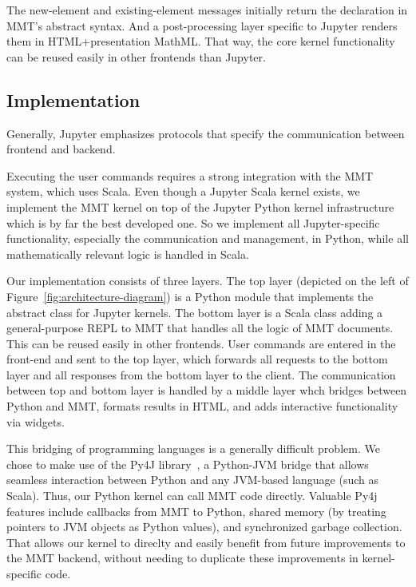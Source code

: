 The new-element and existing-element messages initially return the declaration in MMT's abstract syntax.
And a post-processing layer specific to Jupyter renders them in HTML+presentation MathML.
That way, the core kernel functionality can be reused easily in other frontends than Jupyter.

\subsection{Implementation}\label{sec:kernel:impl}

Generally, Jupyter emphasizes protocols that specify the communication between frontend and backend. 

Executing the user commands requires a strong integration with the MMT system, which uses Scala.
Even though a Jupyter Scala kernel exists, we implement the MMT kernel on top of the Jupyter Python kernel infrastructure which is by far the best developed one. 
So we implement all Jupyter-specific functionality, especially the communication and management, in Python, while all mathematically relevant logic is handled in Scala.

Our implementation consists of three layers.
The top layer (depicted on the left of Figure~\ref{fig:architecture-diagram}) is a Python module that implements the abstract class for Jupyter kernels.
The bottom layer is a Scala class adding a general-purpose REPL to MMT that handles all the logic of MMT documents.
This can be reused easily in other frontends.
User commands are entered in the front-end and sent to the top layer, which forwards all requests to the bottom layer and all responses from the bottom layer to the client.
The communication between top and bottom layer is handled by a middle layer whch bridges between Python and MMT, formats results in HTML, and adds interactive functionality via widgets.


This bridging of programming languages is a generally difficult problem. 
We chose to make use of the Py4J library~\cite{Py4J:on}, a Python-JVM bridge that allows seamless interaction between Python and any JVM-based language (such as Scala).
Thus, our Python kernel can call MMT code directly.
Valuable Py4j features include callbacks from MMT to Python, shared memory (by treating pointers to JVM objects as Python values), and synchronized garbage collection.
That allows our kernel to direclty and easily benefit from future improvements to the MMT backend, without needing to duplicate these improvements in kernel-specific code. 


